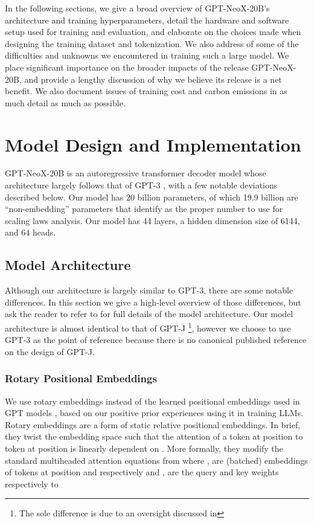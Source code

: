 \documentclass[11pt]{article}
\newcommand{\model}{GPT-NeoX-20B}
\begin{document}
In the following sections, we give a broad overview of \model{}'s architecture and training hyperparameters, detail the hardware and software setup used for training and evaluation, and elaborate on the choices made when designing the training dataset and tokenization. We also address of some of the difficulties and unknowns we encountered in training such a large model. We place significant importance on the broader impacts of the release \model{}, and provide a lengthy discussion of why we believe its release is a net benefit. We also document issues of training cost and carbon emissions in as much detail as much as possible.

\section{Model Design and Implementation}
\label{sec:model-details}

\model{} is an autoregressive transformer decoder model whose architecture largely follows that of GPT-3 \citep{brown2020language}, with a few notable deviations described below. Our model has 20 billion parameters, of which 19.9 billion are ``non-embedding'' parameters that \citet{kaplan2020scaling} identify as the proper number to use for scaling laws analysis. Our model has 44 layers, a hidden dimension size of 6144, and 64 heads.

\subsection{Model Architecture}
\label{subsec:model-arch}

Although our architecture is largely similar to GPT-3, there are some notable differences. In this section we give a high-level overview of those differences, but ask the reader to refer to \cite{brown2020language} for full details of the model architecture. Our model architecture is almost identical to that of GPT-J \citep{gpt-j}\footnote{The sole difference is due to an oversight discussed in }, however we choose to use GPT-3 as the point of reference because there is no canonical published reference on the design of GPT-J.

\subsubsection{Rotary Positional Embeddings}
\label{subsubsec:rope} 
We use rotary embeddings \citep{su2021roformer} instead of the learned positional embeddings used in GPT models \citep{radford2018improving}, based on our positive prior experiences using it in training LLMs. 
Rotary embeddings are a form of static relative positional embeddings. In brief, they twist the embedding space such that the attention of a token at position  to token at position  is linearly dependent on . More formally, they modify the standard multiheaded attention equations from 
where ,  are (batched) embeddings of tokens at position  and  respectively and ,  are the query and key weights respectively to
\end{document}
